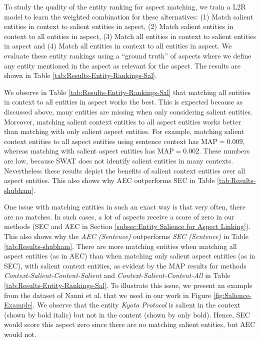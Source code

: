 To study the quality of the entity ranking for aspect matching, we train a L2R model to learn the weighted combination for these alternatives:
(1) Match salient entities in context to salient entities in aspect, (2) Match salient entities in context to all entities in aspect, (3) Match all entities in context to salient entities in aspect and (4) Match all entities in context to all entities in aspect. We evaluate these entity rankings using a ``ground truth'' of aspects where we define any entity mentioned in the aspect as relevant for the aspect. The results are shown in Table \ref{tab:Results-Entity-Rankings-Sal}. 



We observe in Table \ref{tab:Results-Entity-Rankings-Sal} that matching all entities in context to all entities in aspect works the best. This is expected because as discussed above, many entities are missing when only considering salient entities. Moreover, matching salient context entities to all aspect entities works better than matching with only salient aspect entities. For example, matching salient context entities to all aspect entities using sentence context has $\text{MAP}=0.009$, whereas matching with salient aspect entities has $\text{MAP}=0.002$. These numbers are low, because SWAT does not identify salient entities in many contexts. Nevertheless  these results depict the benefits of salient context entities over all aspect entities. This also shows why AEC outperforms SEC in Table \ref{tab:Results-shubham}.

One issue with matching entities in such an exact way is that very often, there are no matches. In such cases, a lot of aspects receive a score of zero in our methods (SEC and AEC in Section \ref{subsec:Entity Salience for Aspect Linking}). This also shows why the \textit{AEC (Sentence)} outperforms  \textit{SEC (Sentence)} in Table \ref{tab:Results-shubham}. There are more matching entities when matching all aspect entities (as in AEC) than when matching only salient aspect entities (as in SEC), with salient context entities, as evident by the MAP results for methods \textit{Context-Salient-Content-Salient} and \textit{Context-Salient-Content-All} in Table \ref{tab:Results-Entity-Rankings-Sal}. To illustrate this issue, we present an example from the dataset of Nanni et al.\cite{nanni2018entity} that we used in our work in Figure \ref{fig:Salience-Example}. We observe that the entity \textit{Kyoto Protocol} is salient in the context (shown by bold italic) but not in the content (shown by only bold). Hence, SEC would score this aspect zero since there are no matching salient entities, but AEC would not.


